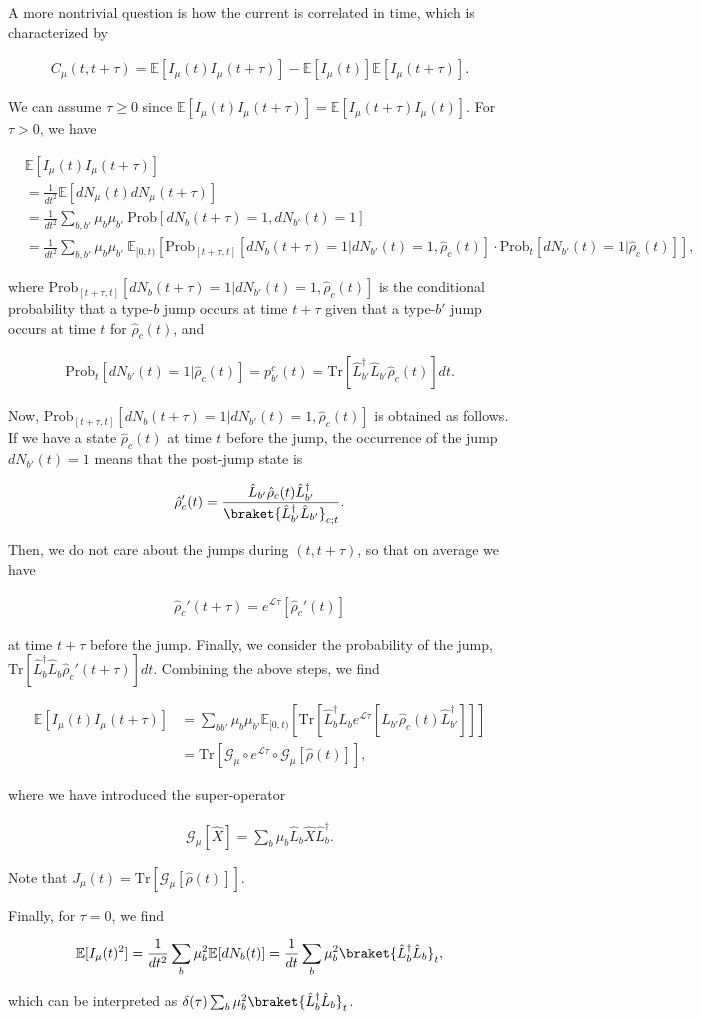 \documentclass[preprint,pteplogo]{ptephy_v2}%
\numberwithin{equation}{section}
\theoremstyle{definition}
\newcommand{\ml}[1]{\mathcal{#1}}
\newcommand{\mr}[1]{\mathrm{#1}}
\newcommand{\mbb}[1]{\mathbb{#1}}
\newcommand{\lrl}[1]{\left[ #1 \right]}
\newcommand{\aln}[1]{
\begin{align}
#1
\end{align}
}
\newcommand{\Tr}{\mr{Tr}}
\begin{document}
A more nontrivial question is how the current is correlated in time, which is characterized by 
\aln{
C_\mu(t,t+\tau)=\mbb{E}[I_\mu(t)I_\mu(t+\tau)]-\mbb{E}[I_\mu(t)]\mbb{E}[I_\mu(t+\tau)].
}
We can assume $\tau\geq 0$ since $\mbb{E}[I_\mu(t)I_\mu(t+\tau)]=\mbb{E}[I_\mu(t+\tau)I_\mu(t)]$.
For $\tau>0$, we have
\aln{
&\mbb{E}[I_\mu(t)I_\mu(t+\tau)]\nonumber\\
&=\frac{1}{dt^2}\mbb{E}[dN_\mu(t)dN_\mu(t+\tau)]\nonumber\\
&=\frac{1}{dt^2}\sum_{b,b'}\mu_b\mu_{b'}\:\mr{Prob}[dN_b(t+\tau)=1,dN_{b'}(t)=1]\nonumber\\
&=\frac{1}{dt^2}\sum_{b,b'}\mu_b\mu_{b'}\:\mbb{E}_{[0,t)}[\mr{Prob}_{[t+\tau,t]}[dN_b(t+\tau)=1|dN_{b'}(t)=1,\hat{\rho}_c(t)]\cdot \mr{Prob}_t[dN_{b'}(t)=1|\hat{\rho}_c(t)]],
}
where $\mr{Prob}_{[t+\tau,t]}[dN_b(t+\tau)=1|dN_{b'}(t)=1,\hat{\rho}_c(t)]$ is the conditional probability that a type-$b$ jump occurs at time $t+\tau$ given that a type-$b'$ jump occurs at time $t$ for $\hat{\rho}_c(t)$, and  
\aln{
\mr{Prob}_t[dN_{b'}(t)=1|\hat{\rho}_c(t)]=p_{b'}^c(t)=\mr{Tr}[\hat{L}_{b'}^\dag\hat{L}_{b'}\hat{\rho}_c(t)]dt.
}

Now, $\mr{Prob}_{[t+\tau,t]}[dN_b(t+\tau)=1|dN_{b'}(t)=1,\hat{\rho}_c(t)]$ is obtained as follows.
If we have a state $\hat{\rho}_c(t)$ at time $t$ before the jump, the occurrence of the jump $dN_{b'}(t)=1$ means that the post-jump state is 
\aln{
\hat{\rho}_c'(t)=\frac{\hat{L}_{b'}\hat{\rho}_c(t)\hat{L}_{b'}^\dag}{\braket{\hat{L}_{b'}^\dag\hat{L}_{b'}}_{c;t}}.
}
Then, we do not care about the jumps during $(t,t+\tau)$, so that on average we have
\aln{
\hat{\rho}_c'(t+\tau)=e^{\ml{L}\tau}[\hat{\rho}_c'(t)]
}
at time $t+\tau$ before the jump.
Finally, we consider the probability of the jump, $\mr{Tr}[\hat{L}_{b}^\dag\hat{L}_{b}\hat{\rho}_c'(t+\tau)]dt$. Combining the above steps, we find 
\aln{
\mbb{E}[I_\mu(t)I_\mu(t+\tau)]&=\sum_{bb'}\mu_b\mu_{b'}\mbb{E}_{[0,t)}\lrl{\Tr[\hat{L}_{b}^\dag\hat{L}_{b}e^{\ml{L}\tau}[\hat{L}_{b'}\hat{\rho}_c(t)\hat{L}_{b'}^\dag]]}\nonumber\\
&=\Tr[\ml{G}_\mu\circ e^{\ml{L}\tau}\circ\ml{G}_\mu[\hat{\rho}(t)]],
}
where we have introduced the super-operator
\aln{
\ml{G}_\mu[\hat{X}]=\sum_b\mu_b\hat{L}_b\hat{X}\hat{L}_b^\dag.
}
Note that $J_\mu(t)=\Tr[\ml{G}_\mu[\hat{\rho}(t)]]$.

Finally, for $\tau=0$, we find
\aln{
\mbb{E}[I_\mu(t)^2]=\frac{1}{dt^2}\sum_b\mu_b^2\mbb{E}[dN_b(t)]
=\frac{1}{dt}\sum_b\mu_b^2\braket{\hat{L}_b^\dag\hat{L}_b}_t,
}
which can be interpreted as $\delta(\tau)\sum_b\mu_b^2\braket{\hat{L}_b^\dag\hat{L}_b}_t$.
\end{document}
